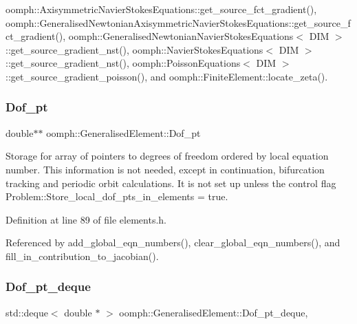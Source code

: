 oomph\+::\+Axisymmetric\+Navier\+Stokes\+Equations\+::get\+\_\+source\+\_\+fct\+\_\+gradient(), oomph\+::\+Generalised\+Newtonian\+Axisymmetric\+Navier\+Stokes\+Equations\+::get\+\_\+source\+\_\+fct\+\_\+gradient(), oomph\+::\+Generalised\+Newtonian\+Navier\+Stokes\+Equations$<$ D\+I\+M $>$\+::get\+\_\+source\+\_\+gradient\+\_\+nst(), oomph\+::\+Navier\+Stokes\+Equations$<$ D\+I\+M $>$\+::get\+\_\+source\+\_\+gradient\+\_\+nst(), oomph\+::\+Poisson\+Equations$<$ D\+I\+M $>$\+::get\+\_\+source\+\_\+gradient\+\_\+poisson(), and oomph\+::\+Finite\+Element\+::locate\+\_\+zeta().

\mbox{\label{classoomph_1_1GeneralisedElement_ad227e5660854a3bc84a5d18eeabb457c}} 
\subsubsection{\texorpdfstring{Dof\+\_\+pt}{Dof\_pt}}
{\footnotesize\ttfamily double$\ast$$\ast$ oomph\+::\+Generalised\+Element\+::\+Dof\+\_\+pt\hspace{0.3cm}{\ttfamily [private]}}



Storage for array of pointers to degrees of freedom ordered by local equation number. This information is not needed, except in continuation, bifurcation tracking and periodic orbit calculations. It is not set up unless the control flag Problem\+::\+Store\+\_\+local\+\_\+dof\+\_\+pts\+\_\+in\+\_\+elements = true. 



Definition at line 89 of file elements.\+h.



Referenced by add\+\_\+global\+\_\+eqn\+\_\+numbers(), clear\+\_\+global\+\_\+eqn\+\_\+numbers(), and fill\+\_\+in\+\_\+contribution\+\_\+to\+\_\+jacobian().

\mbox{\label{classoomph_1_1GeneralisedElement_aa39d74bcbf019835d645ac07503f3232}} 
\subsubsection{\texorpdfstring{Dof\+\_\+pt\+\_\+deque}{Dof\_pt\_deque}}
{\footnotesize\ttfamily std\+::deque$<$ double $\ast$ $>$ oomph\+::\+Generalised\+Element\+::\+Dof\+\_\+pt\+\_\+deque\hspace{0.3cm}{\ttfamily [static]}, {\ttfamily [protected]}}



